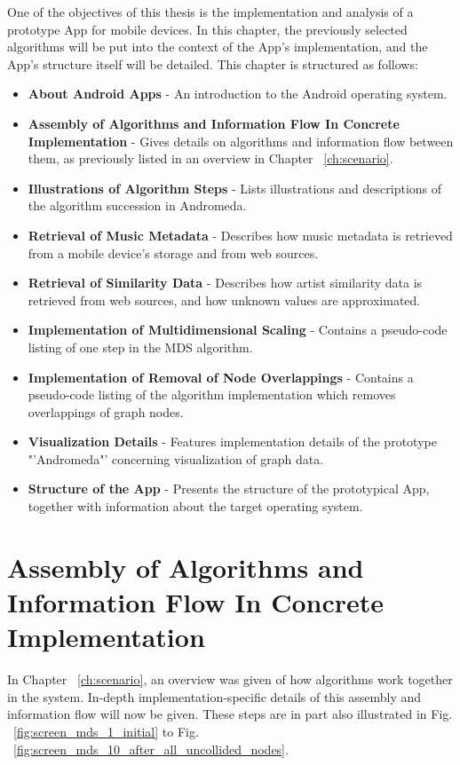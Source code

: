 One of the objectives of this thesis is the implementation and analysis of a prototype App for mobile devices. In this chapter, the previously selected algorithms will be put into the context of the App's implementation, and the App's structure itself will be detailed. This chapter is structured as follows:

\begin{itemize}
	\item \textbf {About Android Apps} - An introduction to the Android operating system.
	\item \textbf {Assembly of Algorithms and Information Flow In Concrete Implementation} - Gives details on algorithms and information flow between them, as previously listed in an overview in Chapter ~\ref{ch:scenario}.
	\item \textbf {Illustrations of Algorithm Steps} - Lists illustrations and descriptions of the algorithm succession in Andromeda.
	\item \textbf {Retrieval of Music Metadata} - Describes how music metadata is retrieved from a mobile device's storage and from web sources.
	\item \textbf {Retrieval of Similarity Data} - Describes how artist similarity data is retrieved from web sources, and how unknown values are approximated.
	\item \textbf {Implementation of Multidimensional Scaling} - Contains a pseudo-code listing of one step in the MDS algorithm.
	\item \textbf {Implementation of Removal of Node Overlappings} - Contains a pseudo-code listing of the algorithm implementation which removes overlappings of graph nodes.
	\item \textbf {Visualization Details} - Features implementation details of the prototype "'Andromeda"' concerning visualization of graph data.
	\item \textbf {Structure of the App} - Presents the structure of the prototypical App, together with information about the target operating system.
\end{itemize}

\section{Assembly of Algorithms and Information Flow In Concrete Implementation}
\label{sec:algorithm-assembly}

In Chapter ~\ref{ch:scenario}, an overview was given of how algorithms work together in the system. In-depth implementation-specific details of this assembly and information flow will now be given. These steps are in part also illustrated in Fig. ~\ref{fig:screen_mds_1_initial} to Fig. ~\ref{fig:screen_mds_10_after_all_uncollided_nodes}.

